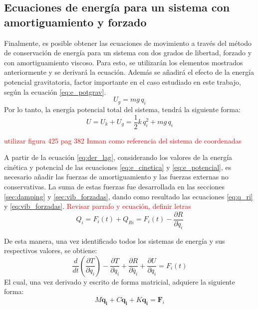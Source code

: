 \subsection{Ecuaciones de energía para un sistema con amortiguamiento y forzado}
Finalmente, es posible obtener las ecuaciones de movimiento a través del método de conservación de energía para un sistema con dos grados de libertad, forzado y con amortiguamiento viscoso. Para esto, se utilizarán los elementos mostrados anteriormente y se derivará la ecuación. Además se añadirá el efecto de la energía potencial gravitatoria, factor importante en el caso estudiado en este trabajo, según la ecuación \ref{eq:e_potgrav}. 
\begin{equation}\label{eq:e_potgrav}
	U_g = mg\,q_i
\end{equation}
Por lo tanto, la energía potencial total del sistema, tendrá la siguiente forma:
\begin{equation}\label{eq:e_potencial}
	U = U_k + U_g = \frac{1}{2}k\,q_i^2 + mg\,q_i
\end{equation}

\textcolor{red}{utilizar figura 425 pag 382 Inman como referencia del sistema de coordenadas}



A partir de la ecuación \ref{eq:der_lag}, considerando los valores de la energía cinética y potencial de las ecuaciones \ref{eq:e_cinetica} y \ref{eq:e_potencial}, es necesario añadir las fuerzas de amortiguamiento y las fuerzas externas no conservativas. La suma de estas fuerzas fue desarrollada en las secciones \ref{sec:damping} y \ref{sec:vib_forzadas}, dando como resultado las ecuaciones \ref{eq:q_ri} y \ref{eq:vib_forzadas}. \textcolor{red}{Revisar parrafo y ecuación, definir letras}
\begin{equation}
	Q_i = F_i(t) + Q_{Ri} = F_i(t) - \frac{\partial R}{\partial \dot{q}_i} 
\end{equation}

De esta manera, una vez identificado todos los sistemas de energía y sus respectivos valores, se obtiene:
\begin{equation}
	\frac{d}{dt}\left(\frac{\partial T}{\partial \dot{q}_i}\right) - \frac{\partial T}{\partial q_i} + \frac{\partial R}{\partial \dot{q_i}} + \frac{\partial U}{\partial q_i} = F_i(t)
\end{equation}
El cual, una vez derivado y escrito de forma matricial, adquiere la siguiente forma:
\begin{equation}
	\mathit{M}\mathbf{\ddot{q}_i} + \mathit{C}\mathbf{\dot{q}_i} + \mathit{K}\mathbf{q_i} = \mathbf{F}_i
\end{equation}

